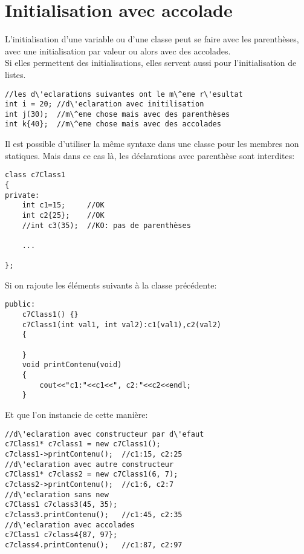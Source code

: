 \documentclass[onecolumn]{book}%
\begin{document}
\section{Initialisation avec accolade}
L'initialisation d'une variable ou d'une classe peut se faire avec les parenthèses, avec une initialisation par valeur ou alors avec des accolades.\\
Si elles permettent des initialisations, elles servent aussi pour l'initialisation de listes.
\begin{framed}
\begin{lstlisting}
//les d\'eclarations suivantes ont le m\^eme r\'esultat
int i = 20; //d\'eclaration avec initilisation
int j(30);  //m\^eme chose mais avec des parenthèses
int k{40};  //m\^eme chose mais avec des accolades
\end{lstlisting}
\end{framed}
Il est possible d'utiliser la m\^eme syntaxe dans une classe pour les membres non statiques. Mais dans ce cas là, les d\'eclarations avec parenthèse sont interdites:
\begin{framed}
\begin{lstlisting}
class c7Class1
{
private:
    int c1=15;     //OK
    int c2{25};    //OK
    //int c3(35);  //KO: pas de parenthèses
    
    ...
    
};
\end{lstlisting}
\end{framed}
Si on rajoute les \'el\'ements suivants à la classe pr\'ec\'edente:
\begin{framed}
\begin{lstlisting}
public:
    c7Class1() {}
    c7Class1(int val1, int val2):c1(val1),c2(val2)
    {
        
    }
    void printContenu(void)
    {
        cout<<"c1:"<<c1<<", c2:"<<c2<<endl;
    }
\end{lstlisting}
\end{framed}
Et que l'on instancie de cette manière:
\begin{framed}
\begin{lstlisting}
//d\'eclaration avec constructeur par d\'efaut
c7Class1* c7class1 = new c7Class1();
c7class1->printContenu();  //c1:15, c2:25
//d\'eclaration avec autre constructeur
c7Class1* c7class2 = new c7Class1(6, 7);
c7class2->printContenu();  //c1:6, c2:7
//d\'eclaration sans new
c7Class1 c7class3(45, 35);
c7class3.printContenu();   //c1:45, c2:35
//d\'eclaration avec accolades
c7Class1 c7class4{87, 97};
c7class4.printContenu();   //c1:87, c2:97
\end{lstlisting}
\end{framed}
\end{document}
